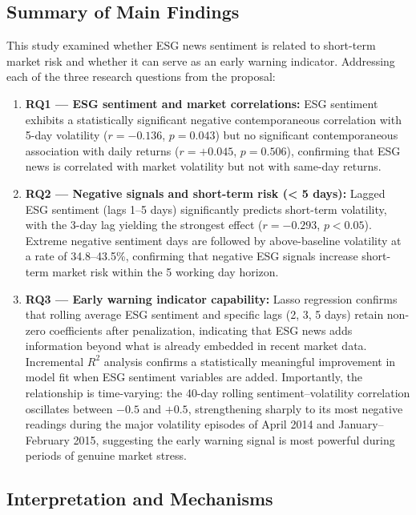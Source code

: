 \documentclass[12pt,a4paper]{article}
\begin{document}
\subsection{Summary of Main Findings}
\label{subsec:summary}

This study examined whether ESG news sentiment is related to short-term market risk and whether it can serve as an early warning indicator. Addressing each of the three research questions from the proposal:

\begin{enumerate}[itemsep=0.5em]
    \item \textbf{RQ1 --- ESG sentiment and market correlations:} ESG sentiment exhibits a statistically significant negative contemporaneous correlation with 5-day volatility ($r = -0.136$, $p = 0.043$) but no significant contemporaneous association with daily returns ($r = +0.045$, $p = 0.506$), confirming that ESG news is correlated with market volatility but not with same-day returns.
    \item \textbf{RQ2 --- Negative signals and short-term risk (< 5 days):} Lagged ESG sentiment (lags 1--5 days) significantly predicts short-term volatility, with the 3-day lag yielding the strongest effect ($r = -0.293$, $p < 0.05$). Extreme negative sentiment days are followed by above-baseline volatility at a rate of 34.8--43.5\%, confirming that negative ESG signals increase short-term market risk within the 5 working day horizon.
    \item \textbf{RQ3 --- Early warning indicator capability:} Lasso regression confirms that rolling average ESG sentiment and specific lags (2, 3, 5 days) retain non-zero coefficients after penalization, indicating that ESG news adds information beyond what is already embedded in recent market data. Incremental $R^2$ analysis confirms a statistically meaningful improvement in model fit when ESG sentiment variables are added. Importantly, the relationship is time-varying: the 40-day rolling sentiment--volatility correlation oscillates between $-0.5$ and $+0.5$, strengthening sharply to its most negative readings during the major volatility episodes of April 2014 and January--February 2015, suggesting the early warning signal is most powerful during periods of genuine market stress.
\end{enumerate}

\subsection{Interpretation and Mechanisms}
\label{subsec:interpretation}
\end{document}

